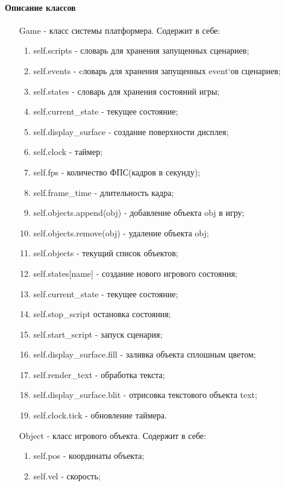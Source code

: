 \paragraph{Описание классов}
\begin{itemize}
		\item[Game] - класс системы платформера. Содержит в себе:
		\begin{enumerate}
				\item self.scripts - словарь для хранения запущенных сценариев;
				\item self.events - cловарь для хранения запущенных event`ов сценариев;
				\item self.states - словарь для хранения состояний игры;
				\item self.current\_state - текущее состояние;
				\item self.display\_surface - создание поверхности дисплея;
				\item self.clock - таймер;
				\item self.fps - количество ФПС(кадров в секунду);
				\item self.frame\_time - длительность кадра;
				\item self.objects.append(obj) - добавление объекта obj в игру;
				\item self.objects.remove(obj) - удаление объекта obj;
				\item self.objects - текущий список объектов;
				\item self.states[name] - создание нового игрового состояния;
				\item self.current\_state - текущее состояние;
				\item self.stop\_script остановка состояния;
				\item self.start\_script - запуск сценария;
				\item self.display\_surface.fill - заливка объекта сплошным цветом;
				\item self.render\_text - обработка текста;
				\item self.display\_surface.blit - отрисовка текстового объекта text;
				\item self.clock.tick - обновление таймера.
		\end{enumerate}
		\item[Object] - класс игрового объекта. Содержит в себе:
		\begin{enumerate}
				\item self.pos - координаты объекта;
				\item self.vel - скорость;

\end{enumerate}
\end{itemize}
